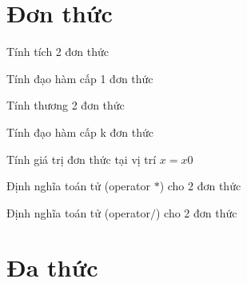 \section{Đơn thức}

\begin{problem}
    Tính tích 2 đơn thức
\end{problem}
\begin{problem}
    Tính đạo hàm cấp 1 đơn thức
\end{problem}
\begin{problem}
    Tính thương 2 đơn thức
\end{problem}
\begin{problem}
    Tính đạo hàm cấp k đơn thức
\end{problem}
\begin{problem}
    Tính giá trị đơn thức tại vị trí $x=x0$
\end{problem}
\begin{problem}
    Định nghĩa toán tử (operator $*$) cho 2 đơn thức
\end{problem}
\begin{problem}
    Định nghĩa toán tử (operator$ /$) cho 2 đơn thức
\end{problem}

\section{Đa thức}

